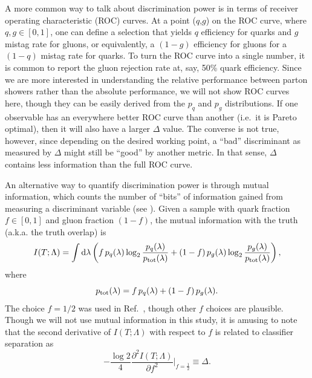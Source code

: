 \documentclass[11pt]{cernrep}
\begin{document}
A more common way to talk about discrimination power is in terms of receiver operating characteristic (ROC) curves.  At a point ($q$,$g$) on the ROC curve, where $q,g \in [0,1]$, one can define a selection that yields $q$ efficiency for quarks and $g$ mistag rate for gluons, or equivalently, a $(1-g)$ efficiency for gluons for a $(1-q)$ mistag rate for quarks.  To turn the ROC curve into a single number, it is common to report the gluon rejection rate at, say, 50\% quark efficiency.  Since we are more interested in understanding the relative performance between parton showers rather than the absolute performance, we will not show ROC curves here, though they can be easily derived from the $p_q$ and $p_g$ distributions.  If one observable has an everywhere better ROC curve than another (i.e.~it is Pareto optimal), then it will also have a larger $\Delta$ value.  The converse is not true, however, since depending on the desired working point, a ``bad'' discriminant as measured by $\Delta$ might still be ``good'' by another metric.  In that sense, $\Delta$ contains less information than the full ROC curve.

An alternative way to quantify discrimination power is through mutual information, which counts the number of ``bits'' of information gained from measuring a discriminant variable (see \cite{Larkoski:2014pca}).  Given a sample with quark fraction $f \in [0,1]$ and gluon fraction $(1-f)$, the mutual information with the truth (a.k.a. the truth overlap) is
\begin{equation}
I(T; \Lambda) = \int \text{d} \lambda \left(f \, p_q(\lambda) \log_2 \frac{p_q(\lambda)}{p_{\rm tot}(\lambda)} + (1-f) \, p_g(\lambda) \log_2 \frac{p_g(\lambda)}{p_{\rm tot}(\lambda)}   \right),
\end{equation}
where
\begin{equation}
p_{\rm tot}(\lambda) = f \, p_q(\lambda) + (1-f) \, p_g(\lambda).
\end{equation}
The choice $f = 1/2$ was used in Ref.~\cite{Larkoski:2014pca}, though other $f$ choices are plausible.  Though we will not use mutual information in this study, it is amusing to note that the second derivative of $I(T;\Lambda)$ with respect to $f$ is related to classifier separation as
\begin{equation}
\label{quarkgluon_eq:altdeltadef}
- \frac{\log 2}{4} \frac{\partial^2 I(T;\Lambda)}{\partial f^2} \Big|_{f = \frac{1}{2}} \equiv \Delta.
\end{equation}
\end{document}

